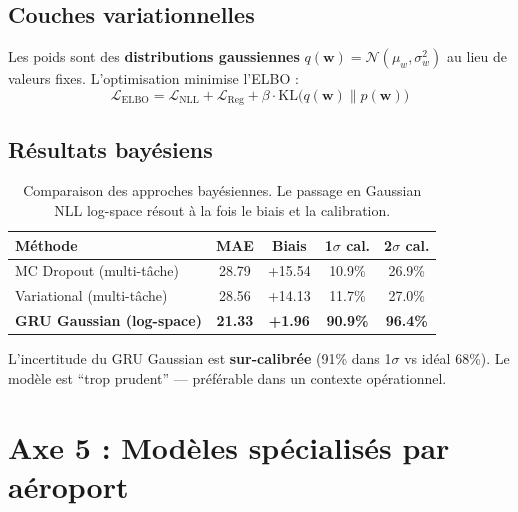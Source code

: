 \documentclass[11pt,a4paper]{article}
\begin{document}
\subsection{Couches variationnelles}

Les poids sont des \textbf{distributions gaussiennes} $q(\mathbf{w}) = \mathcal{N}(\mu_w, \sigma_w^2)$ au lieu de valeurs fixes. L'optimisation minimise l'ELBO :
\begin{equation}
\mathcal{L}_{\text{ELBO}} = \mathcal{L}_{\text{NLL}} + \mathcal{L}_{\text{Reg}} + \beta \cdot \text{KL}\big(q(\mathbf{w}) \| p(\mathbf{w})\big)
\end{equation}

\subsection{Résultats bayésiens}

\begin{table}[H]
\centering
\small
\begin{tabular}{@{}lcccc@{}}
\toprule
\textbf{Méthode} & \textbf{MAE} & \textbf{Biais} & \textbf{1$\sigma$ cal.} & \textbf{2$\sigma$ cal.} \\
\midrule
MC Dropout (multi-tâche)  & 28.79 & +15.54 & 10.9\% & 26.9\% \\
Variational (multi-tâche) & 28.56 & +14.13 & 11.7\% & 27.0\% \\
\midrule
\textbf{GRU Gaussian (log-space)} & \textbf{21.33} & \textbf{+1.96} & \textbf{90.9\%} & \textbf{96.4\%} \\
\bottomrule
\end{tabular}
\caption{Comparaison des approches bayésiennes. Le passage en Gaussian NLL log-space résout à la fois le biais et la calibration.}
\end{table}

L'incertitude du GRU Gaussian est \textbf{sur-calibrée} (91\% dans 1$\sigma$ vs idéal 68\%). Le modèle est ``trop prudent'' — préférable dans un contexte opérationnel.


\section{Axe 5 : Modèles spécialisés par aéroport}
\end{document}
